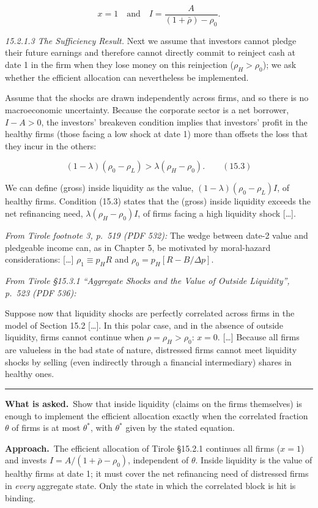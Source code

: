 \documentclass[11pt,a4paper]{article}
\newcommand{\asked}{\par\medskip\noindent\textbf{What is asked.}~}
\newcommand{\approach}{\par\smallskip\noindent\textbf{Approach.}~}
\newcommand{\stmtend}{\par\endgroup\nopagebreak\noindent\rule{\linewidth}{0.4pt}\par\medskip}
\begin{document}
\[x = 1 \quad\text{and}\quad I = \frac{A}{(1 + \bar\rho) - \rho_0}.\]

\emph{15.2.1.3 The Sufficiency Result.} Next we assume that investors cannot pledge their future
earnings and therefore cannot directly commit to reinject cash at date 1 in the firm when they lose
money on this reinjection (\(\rho_H > \rho_0\)); we ask whether the efficient allocation can
nevertheless be implemented.

Assume that the shocks are drawn independently across firms, and so there is no macroeconomic
uncertainty. Because the corporate sector is a net borrower, \(I - A > 0\), the investors' breakeven
condition implies that investors' profit in the healthy firms (those facing a low shock at date 1)
more than offsets the loss that they incur in the others:

\[(1 - \lambda)(\rho_0 - \rho_L) > \lambda(\rho_H - \rho_0). \qquad (15.3)\]

We can define (gross) inside liquidity as the value, \((1 - \lambda)(\rho_0 - \rho_L)I\), of healthy
firms. Condition (15.3) states that the (gross) inside liquidity exceeds the net refinancing need,
\(\lambda(\rho_H - \rho_0)I\), of firms facing a high liquidity shock {[}\ldots{]}.

\emph{From Tirole footnote 3, p.~519 (PDF 532):} The wedge between date-2 value and pledgeable
income can, as in Chapter 5, be motivated by moral-hazard considerations: {[}\ldots{]}
\(\rho_1 \equiv p_H R\) and \(\rho_0 = p_H[R - B/\Delta p]\).

\emph{From Tirole §15.3.1 ``Aggregate Shocks and the Value of Outside Liquidity'', p.~523 (PDF
536):}

Suppose now that liquidity shocks are perfectly correlated across firms in the model of Section 15.2
{[}\ldots{]}. In this polar case, and in the absence of outside liquidity, firms cannot continue
when \(\rho = \rho_H > \rho_0\): \(x = 0\). {[}\ldots{]} Because all firms are valueless in the bad
state of nature, distressed firms cannot meet liquidity shocks by selling (even indirectly through a
financial intermediary) shares in healthy ones.
\stmtend

\asked Show that inside liquidity (claims on the firms themselves) is enough to implement the efficient allocation exactly when the correlated fraction $\theta$ of firms is at most $\theta^*$, with $\theta^*$ given by the stated equation.

\approach The efficient allocation of Tirole \S15.2.1 continues all firms ($x=1$) and invests $I=A/(1+\bar\rho-\rho_0)$, independent of $\theta$. Inside liquidity is the value of healthy firms at date 1; it must cover the net refinancing need of distressed firms in \emph{every} aggregate state. Only the state in which the correlated block is hit is binding.
\end{document}
